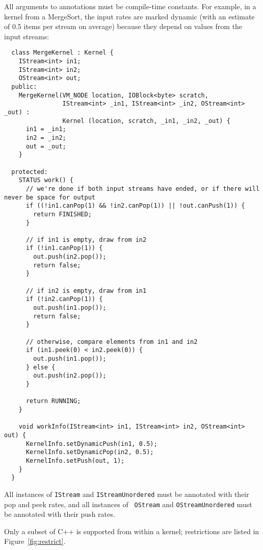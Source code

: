 All arguments to annotations must be compile-time constants.  For
example, in a kernel from a MergeSort, the input rates are marked
dynamic (with an estimate of 0.5 items per stream on average) because
they depend on values from the input streams:
{\small
\begin{verbatim}
  class MergeKernel : Kernel {
    IStream<int> in1;
    IStream<int> in2;
    OStream<int> out;
  public:
    MergeKernel(VM_NODE location, IOBlock<byte> scratch,
                IStream<int> _in1, IStream<int> _in2, OStream<int> _out) :
                Kernel (location, scratch, _in1, _in2, _out) {
      in1 = _in1;
      in2 = _in2;
      out = _out;
    }

  protected:
    STATUS work() {
      // we're done if both input streams have ended, or if there will never be space for output
      if ((!in1.canPop(1) && !in2.canPop(1)) || !out.canPush(1)) {
        return FINISHED;
      }

      // if in1 is empty, draw from in2
      if (!in1.canPop(1)) {          
        out.push(in2.pop());
        return false;
      }

      // if in2 is empty, draw from in1
      if (!in2.canPop(1)) {
        out.push(in1.pop());
        return false;
      } 

      // otherwise, compare elements from in1 and in2
      if (in1.peek(0) < in2.peek(0)) {
        out.push(in1.pop());
      } else {
        out.push(in2.pop());
      }

      return RUNNING;
    }

    void workInfo(IStream<int> in1, IStream<int> in2, OStream<int> out) {
      KernelInfo.setDynamicPush(in1, 0.5);
      KernelInfo.setDynamicPop(in2, 0.5);
      KernelInfo.setPush(out, 1);
    }
  }  
\end{verbatim}}

All instances of {\tt IStream} and {\tt IStreamUnordered} must be
annotated with their pop and peek rates, and all instances of {\tt
OStream} and {\tt OStreamUnordered} must be annotated with their push
rates.


Only a subset of C++ is supported from within a kernel; restrictions
are listed in Figure~\ref{fig:restrict}.  

